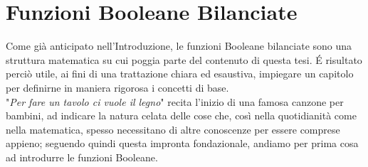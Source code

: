 \documentclass[12pt,a4paper,openright]{report}
\begin{document}
\chapter{Funzioni Booleane Bilanciate}
Come già anticipato nell'Introduzione, le funzioni Booleane bilanciate sono una struttura matematica su cui poggia parte del contenuto di questa tesi.
É risultato perciò utile, ai fini di una trattazione chiara ed esaustiva, impiegare un capitolo per definirne in maniera rigorosa i concetti di base.\\
"\textit{Per fare un tavolo ci vuole il legno}" recita l'inizio di una famosa canzone per bambini, ad indicare la natura celata delle cose che, così nella quotidianità
come nella matematica, spesso necessitano di altre conoscenze per essere comprese appieno; seguendo quindi questa impronta fondazionale, andiamo per prima cosa ad introdurre le funzioni Booleane.
\end{document}
